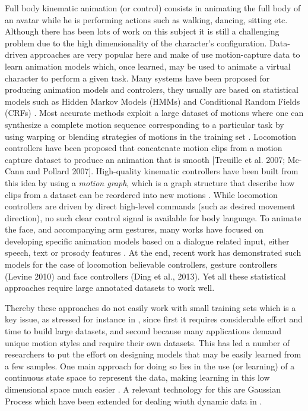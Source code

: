 Full body kinematic animation (or control) consists in animating the full body of an avatar while he is performing actions such as walking, dancing, sitting etc. Although there has been lots of work on this subject it is still a challenging problem due to the high dimensionality of the character's configuration. Data-driven approaches are very popular here and make of use motion-capture data to learn animation models which, once learned, may be used to animate a virtual character to perform a given task. 
Many systems have been proposed for producing animation models and controlers, they usually are based on statistical models such as Hidden Markov Models (HMMs) \cite{DBLP:journals/tog/LevineTK09} and Conditional Random Fields (CRFs) \cite{DBLP:journals/tog/LevineKTK10, DBLP:conf/atal/ChiuM14}. Most accurate methods exploit a large dataset of motions where one can synthesize a complete motion sequence corresponding to a particular task by using warping or blending strategies of motions in the training set \cite{WitkinAndPopovic1995}. Locomotion controllers have been proposed that concatenate motion
clips from a motion capture dataset to produce an animation that is smooth [Treuille et al. 2007; Mc-Cann and Pollard 2007]. High-quality kinematic controllers have been built from this idea by using a {\it motion graph}, which is a graph structure that describe how clips from a dataset can be reordered into new motions \cite{LeeEtAl2002}. 
While locomotion controllers are driven
by direct high-level commands (such as desired movement direction), no such clear control signal is available for body language. To animate the face, and accompanying arm gestures, many works have focused on developing specific animation models based on a dialogue related input, either speech, text or prosody features \cite{DBLP:journals/tog/LevineTK09, DBLP:journals/tog/LevineKTK10, DBLP:conf/atal/ChiuM14, NOUS}. 
At the end, recent work has demonstrated such models for the case of locomotion believable controllers, gesture controllers (Levine 2010) and face controllers (Ding et al., 2013). 
Yet all these statistical approaches require large annotated datasets to work well.

Thereby these approaches do not easily work with small training sets which is a key issue, as stressed for instance in \cite{DBLP:journals/tog/LevineWHPK12}, since first it requires considerable effort and time to build large datasets, and second because many applications demand unique motion styles and require their own datasets. This has led a number of researchers to put the effort on designing models that may be easily learned from a few samples. One main approach for doing so lies in the use (or learning) of a continuous state space to represent the data, making learning in this low dimensional space much easier  \cite{DBLP:journals/tog/LevineWHPK12, DBLP:conf/atal/ChiuM14}. A relevant technology for this are Gaussian Process which have been extended for dealing wiuth dynamic data in \cite{DBLP:journals/pami/WangFH08}.

